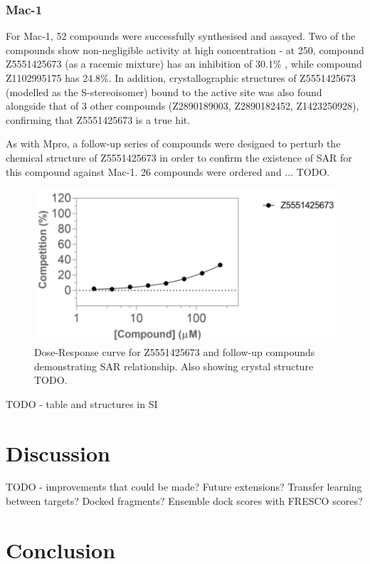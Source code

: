 \subsubsection{Mac-1}
For Mac-1, 52 compounds were successfully synthesised and assayed. Two of the compounds show non-negligible activity at high concentration - at 250\uM, compound Z5551425673 (as a racemic mixture) has an inhibition of 30.1\% , while compound Z1102995175 has 24.8\%. In addition, crystallographic structures of Z5551425673 (modelled as the S-stereoisomer) bound to the active site was also found alongside that of 3 other compounds (Z2890189003, Z2890182452, Z1423250928), confirming that Z5551425673 is a true hit.

As with Mpro, a follow-up series of compounds were designed to perturb the chemical structure of Z5551425673 in order to confirm the existence of SAR for this compound against Mac-1. 26 compounds were ordered and ... TODO.

\begin{figure}
    \centering
    \includegraphics[width=\linewidth]{Ch2/Figs/mac1_hit_IC50.png}
    \caption{Dose-Response curve for Z5551425673 and follow-up compounds demonstrating SAR relationship. Also showing crystal structure TODO.}
    \label{fig:mac1_hit}
\end{figure}

TODO - table and structures in SI

\section{Discussion}

TODO - improvements that could be made? Future extensions? Transfer learning between targets? Docked fragments? Ensemble dock scores with FRESCO scores?

\section{Conclusion}

